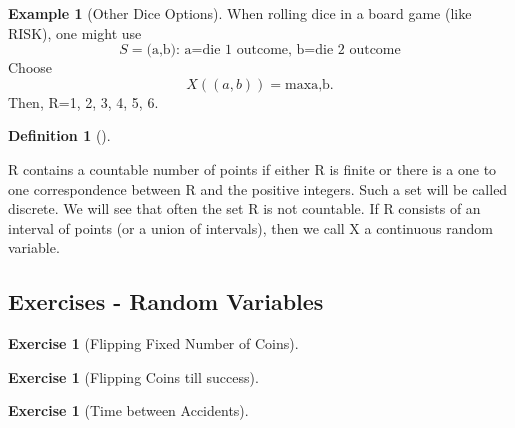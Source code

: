 \documentclass[10pt,]{book}
\theoremstyle{plain}
\theoremstyle{definition}
\newtheorem{definition}[theorem]{Definition}
\theoremstyle{definition}
\newtheorem{example}[theorem]{Example}
\theoremstyle{definition}
\newtheorem{exercise}[theorem]{Exercise}
\numberwithin{equation}{section}
\begin{document}
\begin{example}[Other Dice Options]\label{example-12}
When rolling dice in a board game (like RISK), one might use
	\begin{equation*}S= \text{{(a,b): a=die 1 outcome, b=die 2 outcome}}\end{equation*}
	Choose 
	\begin{equation*}X( (a,b) ) = \text{max{a,b}}.\end{equation*} 
	Then, R={1, 2, 3, 4, 5, 6}.
\end{example}
\begin{definition}[{}]\label{definition-25}

		R contains a countable number of points if either R is finite or there 
		is a one to one correspondence between R and the positive integers. 
		Such a set will be called discrete. We will see that often the set R is not countable. 
		If R consists of an interval of points (or a union of intervals), 
		then we call X a continuous random variable. 
		\end{definition}
\typeout{************************************************}
\typeout{************************************************}
\subsection[{Exercises - Random Variables}]{Exercises - Random Variables}\label{subsection-6}
\begin{exercise}[{Flipping Fixed Number of Coins}]\label{exercise-41}
\end{exercise}
\begin{exercise}[{Flipping Coins till success}]\label{exercise-42}
\end{exercise}
\begin{exercise}[{Time between Accidents}]\label{exercise-43}
\end{exercise}
\typeout{************************************************}
\typeout{************************************************}
\end{document}
